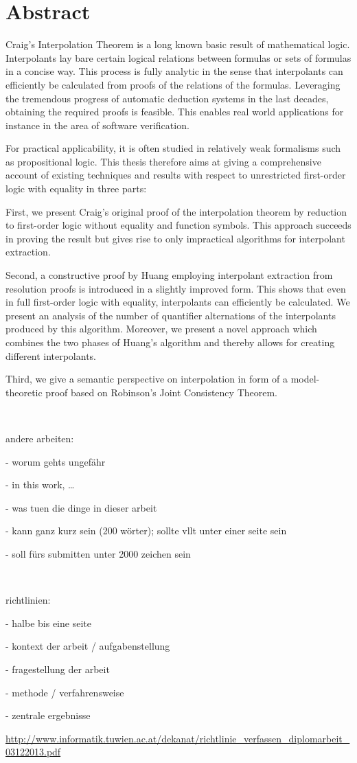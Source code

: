 \chapter*{Abstract}

Craig's Interpolation Theorem is a long known basic result of mathematical logic.
Interpolants lay bare certain logical relations between formulas or sets of formulas in a
concise way.
This process is fully analytic in the sense that interpolants can efficiently
be calculated from proofs of the relations of the formulas. Leveraging the tremendous
progress of automatic deduction systems in the last decades, obtaining the required proofs
is feasible. 
This enables real world applications for instance in the area of software verification.

For practical applicability, it is often studied in relatively weak formalisms such as propositional logic.
This thesis therefore aims at giving a comprehensive account of existing techniques and results with respect to unrestricted first-order logic with equality in three parts:

First, we present Craig's original proof of the interpolation theorem by reduction to first-order logic without equality and function symbols.
This approach succeeds in proving the result but gives rise to only impractical algorithms for interpolant extraction.

Second, a constructive proof by Huang employing interpolant extraction from resolution proofs is introduced in a slightly improved form.
This shows that even in full first-order logic with equality, interpolants can efficiently be calculated.
We present an analysis of the number of quantifier alternations of the interpolants produced by this algorithm.
Moreover, we present a novel approach which combines the two phases of Huang's algorithm and thereby allows for creating different interpolants.

Third, we give a semantic perspective on interpolation in form of a model-theoretic proof based on Robinson's Joint Consistency Theorem.






~

andere arbeiten:

- worum gehts ungefähr

- in this work, \dots

- was tuen die dinge in dieser arbeit

- kann ganz kurz sein (200 wörter); sollte vllt unter einer seite sein

- soll fürs submitten unter 2000 zeichen sein

~

richtlinien:

- halbe bis eine seite

- kontext der arbeit / aufgabenstellung

- fragestellung der arbeit

- methode / verfahrensweise

- zentrale ergebnisse


\url{http://www.informatik.tuwien.ac.at/dekanat/richtlinie_verfassen_diplomarbeit_03122013.pdf}


